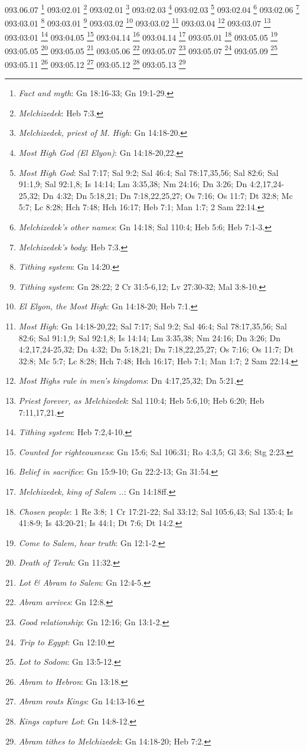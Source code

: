 093.06.07 \footnote{\textit{Fact and myth}: Gn 18:16-33; Gn 19:1-29.}
093:02.01 \footnote{\textit{Melchizedek}: Heb 7:3.}
093:02.01 \footnote{\textit{Melchizedek, priest of M. High}: Gn 14:18-20.}
093:02.03 \footnote{\textit{Most High God (El Elyon)}: Gn 14:18-20,22.}
093:02.03 \footnote{\textit{Most High God}: Sal 7:17; Sal 9:2; Sal 46:4; Sal 78:17,35,56; Sal 82:6; Sal 91:1,9; Sal 92:1,8; Is 14:14; Lm 3:35,38; Nm 24:16; Dn 3:26; Dn 4:2,17,24-25,32; Dn 4:32; Dn 5:18,21; Dn 7:18,22,25,27; Os 7:16; Os 11:7; Dt 32:8; Mc 5:7; Lc 8:28; Hch 7:48; Hch 16:17; Heb 7:1; Man 1:7; 2 Sam 22:14.}
093:02.04 \footnote{\textit{Melchizedek's other names}: Gn 14:18; Sal 110:4; Heb 5:6; Heb 7:1-3.}
093:02.06 \footnote{\textit{Melchizedek's body}: Heb 7:3.}
093:03.01 \footnote{\textit{Tithing system}: Gn 14:20.}
093:03.01 \footnote{\textit{Tithing system}: Gn 28:22; 2 Cr 31:5-6,12; Lv 27:30-32; Mal 3:8-10.}
093:03.02 \footnote{\textit{El Elyon, the Most High}: Gn 14:18-20; Heb 7:1.}
093:03.02 \footnote{\textit{Most High}: Gn 14:18-20,22; Sal 7:17; Sal 9:2; Sal 46:4; Sal 78:17,35,56; Sal 82:6; Sal 91:1,9; Sal 92:1,8; Is 14:14; Lm 3:35,38; Nm 24:16; Dn 3:26; Dn 4:2,17,24-25,32; Dn 4:32; Dn 5:18,21; Dn 7:18,22,25,27; Os 7:16; Os 11:7; Dt 32:8; Mc 5:7; Lc 8:28; Hch 7:48; Hch 16:17; Heb 7:1; Man 1:7; 2 Sam 22:14.}
093:03.04 \footnote{\textit{Most Highs rule in men's kingdoms}: Dn 4:17,25,32; Dn 5:21.}
093:03.07 \footnote{\textit{Priest forever, as Melchizedek}: Sal 110:4; Heb 5:6,10; Heb 6:20; Heb 7:11,17,21.}
093:03:01 \footnote{\textit{Tithing system}: Heb 7:2,4-10.}
093:04.05 \footnote{\textit{Counted for righteousness}: Gn 15:6; Sal 106:31; Ro 4:3,5; Gl 3:6; Stg 2:23.}
093:04.14 \footnote{\textit{Belief in sacrifice}: Gn 15:9-10; Gn 22:2-13; Gn 31:54.}
093:04.14 \footnote{\textit{Melchizedek, king of Salem ..}: Gn 14:18ff.}
093:05.01 \footnote{\textit{Chosen people}: 1 Re 3:8; 1 Cr 17:21-22; Sal 33:12; Sal 105:6,43; Sal 135:4; Is 41:8-9; Is 43:20-21; Is 44:1; Dt 7:6; Dt 14:2.}
093:05.05 \footnote{\textit{Come to Salem, hear truth}: Gn 12:1-2.}
093:05.05 \footnote{\textit{Death of Terah}: Gn 11:32.}
093:05.05 \footnote{\textit{Lot & Abram to Salem}: Gn 12:4-5.}
093:05.06 \footnote{\textit{Abram arrives}: Gn 12:8.}
093:05.07 \footnote{\textit{Good relationship}: Gn 12:16; Gn 13:1-2.}
093:05.07 \footnote{\textit{Trip to Egypt}: Gn 12:10.}
093:05.09 \footnote{\textit{Lot to Sodom}: Gn 13:5-12.}
093:05.11 \footnote{\textit{Abram to Hebron}: Gn 13:18.}
093:05.12 \footnote{\textit{Abram routs Kings}: Gn 14:13-16.}
093:05.12 \footnote{\textit{Kings capture Lot}: Gn 14:8-12.}
093:05.13 \footnote{\textit{Abram tithes to Melchizedek}: Gn 14:18-20; Heb 7:2.}
